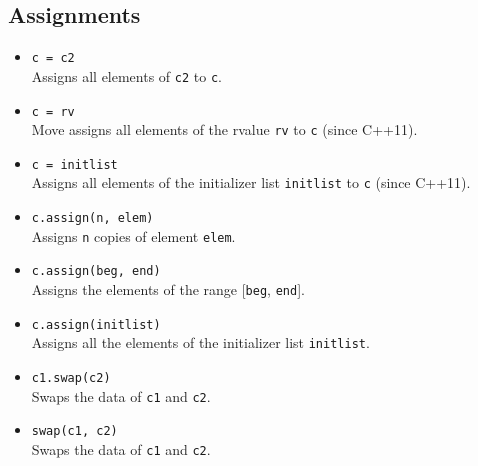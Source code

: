 \documentclass{report}
\begin{document}
\pagebreak 
\subsection{Assignments}
\begin{itemize}
    \item \texttt{c = c2} \\
          Assigns all elements of \texttt{c2} to \texttt{c}.
          
    \item \texttt{c = rv} \\
          Move assigns all elements of the rvalue \texttt{rv} to \texttt{c} (since C++11).
          
    \item \texttt{c = initlist} \\
          Assigns all elements of the initializer list \texttt{initlist} to \texttt{c} (since C++11).
          
    \item \texttt{c.assign(n, elem)} \\
          Assigns \texttt{n} copies of element \texttt{elem}.
          
    \item \texttt{c.assign(beg, end)} \\
          Assigns the elements of the range [\texttt{beg}, \texttt{end}].
          
    \item \texttt{c.assign(initlist)} \\
          Assigns all the elements of the initializer list \texttt{initlist}.
          
    \item \texttt{c1.swap(c2)} \\
          Swaps the data of \texttt{c1} and \texttt{c2}.
          
    \item \texttt{swap(c1, c2)} \\
          Swaps the data of \texttt{c1} and \texttt{c2}.
\end{itemize}

\bigbreak \noindent 
\end{document}
